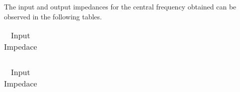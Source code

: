 %    


%    


The input and output impedances for the central frequency obtained can be observed in the following tables.

%    

%    










\begin{table}


\parbox{.45\linewidth}{
  \centering
  \begin{tabular}{|c|c|}
    \hline    
    
  \end{tabular}
  \caption{Output Impedace}
}

\hfill
\parbox{.45\linewidth}{
  \centering
  \begin{tabular}{|c|c|c|}
    \hline    
    
  \end{tabular}
  \caption{Input Impedace}
}

\end{table}














